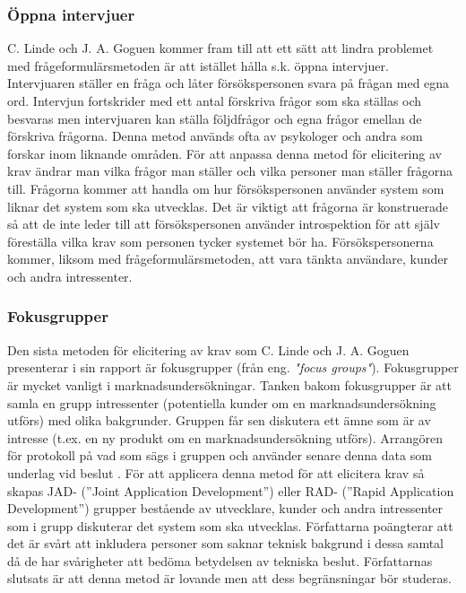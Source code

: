 \subsubsection{Öppna intervjuer} 
 C. Linde och J. A. Goguen kommer fram till att ett sätt att lindra problemet med frågeformulärsmetoden är att istället hålla s.k. öppna intervjuer. Intervjuaren ställer en fråga och låter försökspersonen svara på frågan med egna ord. Intervjun fortskrider med ett antal förskriva frågor som ska ställas och besvaras men intervjuaren kan ställa följdfrågor och egna frågor emellan de förskriva frågorna. Denna metod används ofta av psykologer och andra som forskar inom liknande områden. För att anpassa denna metod för elicitering av krav ändrar man vilka frågor man ställer och vilka personer man ställer frågorna till. Frågorna kommer att handla om hur försökspersonen använder system som liknar det system som ska utvecklas. Det är viktigt att frågorna är konstruerade så att de inte leder till att försökspersonen använder introspektion för att själv föreställa vilka krav som personen tycker systemet bör ha. Försökspersonerna kommer, liksom med frågeformulärsmetoden, att vara tänkta användare, kunder och andra intressenter. 

\subsubsection{Fokusgrupper}
Den sista metoden för elicitering av krav som C. Linde och J. A. Goguen presenterar i sin rapport är fokusgrupper (från eng. \textit{"focus groups"}). Fokusgrupper är mycket vanligt i marknadsundersökningar. Tanken bakom fokusgrupper är att samla en grupp intressenter (potentiella kunder om en marknadsundersökning utförs) med olika bakgrunder. Gruppen får sen diskutera ett ämne som är av intresse (t.ex. en ny produkt om en marknadsundersökning utförs). Arrangören för protokoll på vad som sägs i gruppen och använder senare denna data som underlag vid beslut \cite{hylander1998fokusgrupper}. För att applicera denna metod för att elicitera krav så skapas JAD- (”Joint Application Development”) eller RAD- (”Rapid Application Development”) grupper bestående av utvecklare, kunder och andra intressenter som i grupp diskuterar det system som ska utvecklas. Författarna poängterar att det är svårt att inkludera personer som saknar teknisk bakgrund i dessa samtal då de har svårigheter att bedöma betydelsen av tekniska beslut. Författarnas slutsats är att denna metod är lovande men att dess begränsningar bör studeras. 

